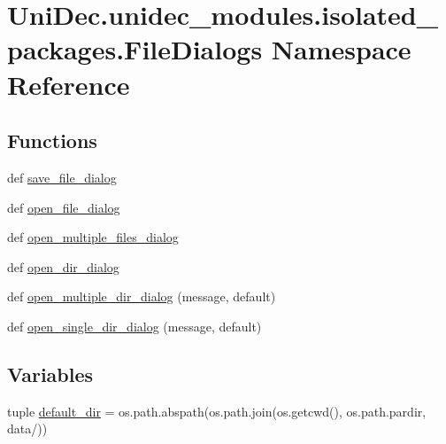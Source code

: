 \hypertarget{namespace_uni_dec_1_1unidec__modules_1_1isolated__packages_1_1_file_dialogs}{}\section{Uni\+Dec.\+unidec\+\_\+modules.\+isolated\+\_\+packages.\+File\+Dialogs Namespace Reference}
\label{namespace_uni_dec_1_1unidec__modules_1_1isolated__packages_1_1_file_dialogs}
\subsection*{Functions}
\begin{DoxyCompactItemize}
\item 
def \hyperlink{namespace_uni_dec_1_1unidec__modules_1_1isolated__packages_1_1_file_dialogs_ae3192b34a63f06a61d2d5539a5a92c9e}{save\+\_\+file\+\_\+dialog}
\item 
def \hyperlink{namespace_uni_dec_1_1unidec__modules_1_1isolated__packages_1_1_file_dialogs_af91d05174dd9fc90bacbbc7c262c63cc}{open\+\_\+file\+\_\+dialog}
\item 
def \hyperlink{namespace_uni_dec_1_1unidec__modules_1_1isolated__packages_1_1_file_dialogs_a22b98756edebfbf320515d38efbc36ef}{open\+\_\+multiple\+\_\+files\+\_\+dialog}
\item 
def \hyperlink{namespace_uni_dec_1_1unidec__modules_1_1isolated__packages_1_1_file_dialogs_a2ddd4643ab8058add7e3bd42519c22a1}{open\+\_\+dir\+\_\+dialog}
\item 
def \hyperlink{namespace_uni_dec_1_1unidec__modules_1_1isolated__packages_1_1_file_dialogs_a0036b762bb5532f14d5e20f65d6e9170}{open\+\_\+multiple\+\_\+dir\+\_\+dialog} (message, default)
\item 
def \hyperlink{namespace_uni_dec_1_1unidec__modules_1_1isolated__packages_1_1_file_dialogs_a4a70cb2c5495c58b08d2a49b4400faef}{open\+\_\+single\+\_\+dir\+\_\+dialog} (message, default)
\end{DoxyCompactItemize}
\subsection*{Variables}
\begin{DoxyCompactItemize}
\item 
tuple \hyperlink{namespace_uni_dec_1_1unidec__modules_1_1isolated__packages_1_1_file_dialogs_a1c1be4126aea611169e188de2ab86649}{default\+\_\+dir} = os.\+path.\+abspath(os.\+path.\+join(os.\+getcwd(), os.\+path.\+pardir, \textquotesingle{}data/\textquotesingle{}))
\end{DoxyCompactItemize}


